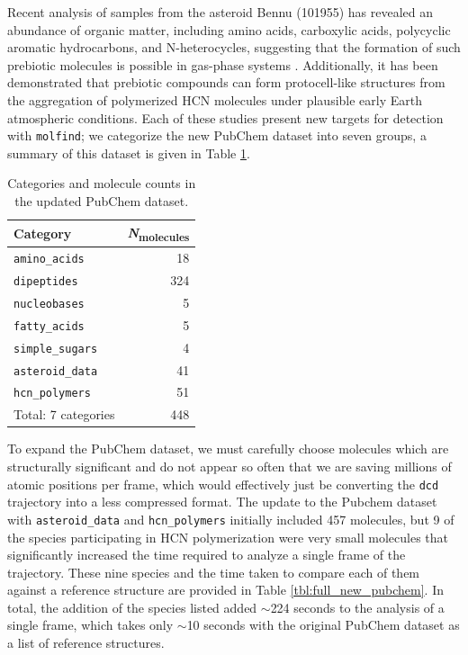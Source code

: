 Recent analysis of samples from the asteroid Bennu (101955) has revealed an abundance of organic matter, including amino acids, carboxylic acids, polycyclic aromatic hydrocarbons, and N-heterocycles, suggesting that the formation of such prebiotic molecules is possible in gas-phase systems \cite{astroid_sample}.
Additionally, it has been demonstrated \cite{prebiotic_compounds_EE_atmosphere} that prebiotic compounds can form protocell-like structures from the aggregation of polymerized HCN molecules under plausible early Earth atmospheric conditions. 
Each of these studies present new targets for detection with \verb|molfind|; we categorize the new PubChem dataset into seven groups, a summary of this dataset is given in Table \ref{tbl:new_pubchem}.

\begin{table}[h!]
\centering
\caption[Updated PubChem database]{Categories and molecule counts in the updated PubChem dataset.}\label{tbl:new_pubchem}
\begin{tabularx}{0.34\textwidth}{lr}  
\toprule
Category & \textit{N}\textsubscript{molecules} \\
\midrule
\verb|amino_acids| & 18 \\
\verb|dipeptides| & 324 \\
\verb|nucleobases| & 5 \\
\verb|fatty_acids| & 5 \\
\verb|simple_sugars| & 4 \\
\verb|asteroid_data| & 41 \\
\verb|hcn_polymers| & 51 \\
Total: 7 categories & 448 \\
\bottomrule
\end{tabularx}
\end{table}

To expand the PubChem dataset, we must carefully choose molecules which are structurally significant and do not appear so often that we are saving millions of atomic positions per frame, which would effectively just be converting the \verb|dcd| trajectory into a less compressed format.
The update to the Pubchem dataset with \verb|asteroid_data| and \verb|hcn_polymers| initially included 457 molecules, but 9 of the species participating in HCN polymerization were very small molecules that significantly increased the time required to analyze a single frame of the trajectory.
These nine species and the time taken to compare each of them against a reference structure are provided in Table \ref{tbl:full_new_pubchem}.
In total, the addition of the species listed added $\sim$224 seconds to the analysis of a single frame, which takes only $\sim$10 seconds with the original PubChem dataset as a list of reference structures. 

